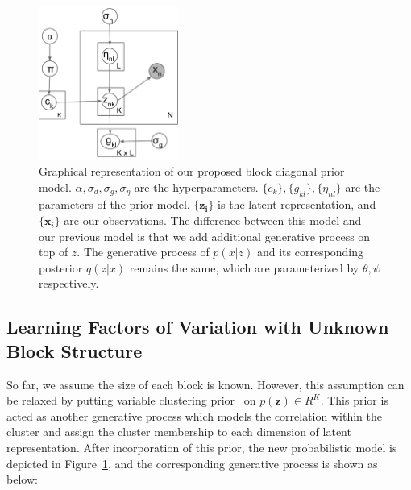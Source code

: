 \begin{figure}[hb]
  \centering
  \includegraphics[width=1.8in]{images/blockmodel.pdf}
  \caption[]
   {Graphical representation of our proposed block diagonal prior model. $\alpha, \sigma_d, \sigma_g, \sigma_{\eta}$ are the hyperparameters. $\{c_k\}, \{g_{kl}\}, \{\eta_{nl}\}$ are the parameters of the prior model. $\{\mathbf{z_i}\}$ is the latent representation, and $\{\mathbf{x}_i\}$ are our observations. The difference between this model and our previous model is that we add additional generative process on top of $z$. The generative process of $p(x|z)$ and its corresponding posterior $q(z|x)$ remains the same, which are parameterized by $\theta, \psi$ respectively. }
  \label{fig:blockprior}
\end{figure}

\subsection{Learning Factors of Variation with Unknown Block Structure}

So far, we assume the size of each block is known. However, this assumption can be relaxed by putting variable clustering prior~\cite{palla2012nonparametric} on $p(\mathbf{z})\in R^K$. This prior is acted as another generative process which models the correlation within the cluster and assign the cluster membership to each dimension of latent representation. After incorporation of this prior, the new probabilistic model is depicted in Figure~\ref{fig:blockprior}, and the corresponding generative process is shown as below:


